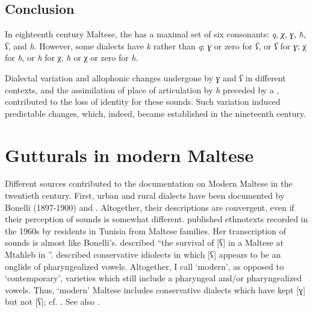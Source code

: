 \documentclass[output=paper]{langsci/langscibook}
\begin{document}
\ea%
    \label{ex:puech:13}
    \begin{xlist}
    \end{xlist}
\z

\newpage 
\subsection{Conclusion}

In eighteenth century Maltese, the  has a maximal set of six  consonants: 
\textit{q}, 
\textit{χ}, 
\textit{ɣ}, 
\textit{ħ}, 
\textit{ʕ}, and 
\textit{h}. 
However, some dialects have  
\textit{k} rather than 
\textit{q}; 
\textit{ɣ} or zero for 
\textit{ʕ}, or 
\textit{ʕ} for 
\textit{ɣ}; χ for 
\textit{ħ}, or 
\textit{ħ} for χ; 
\textit{ħ} or χ or zero for \textit{h}. 

Dialectal variation and allophonic changes undergone by \textit{ɣ} and \textit{ʕ} in different contexts, and the assimilation of place of articulation by \textit{h} preceded by a , contributed to the loss of identity for these sounds. Such variation induced predictable changes, which, indeed, became established in the nineteenth century.

\section{Gutturals in modern Maltese}
Different sources contributed to the documentation on Modern Maltese in the twentieth century. First, urban and rural dialects have been documented by Bonelli (1897-1900) and \citet{Stumme1904}. Altogether, their descriptions are convergent, even if their perception of  sounds is somewhat different. \citet{Saada1986} published ethnotexts recorded in the 1960s by residents in Tunisia from Maltese families. Her transcription of  sounds is almost like Bonelli's. \citet{Vanhove1991} described “the survival of [ʕ] in a Maltese  at Mtaħleb in ”. \citet{Schabert1976} described conservative idiolects in which [ʕ] appears to be an onglide of pharyngealized vowels. Altogether, I call ‘modern’, as opposed to ‘contemporary’, varieties which still include a pharyngeal  and/or pharyngealized vowels. Thus, ‘modern’ Maltese includes conservative  dialects which have kept [ɣ] but not [ʕ]; cf. \citet[texts 8 to 10 from Għarb]{Puech1994}. See also \citet{AquilinaIsserlin1981}.
\end{document}

